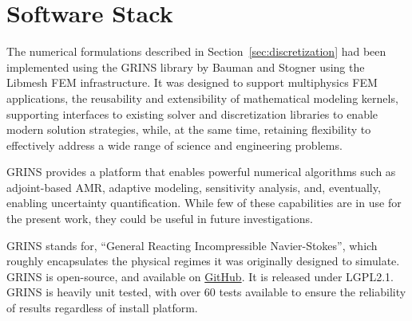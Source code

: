 

\section{Software Stack}

The numerical formulations described in Section~\ref{sec:discretization}
had been implemented using the GRINS library\cite{GRINSpaper} by Bauman
and Stogner using the Libmesh\cite{libMeshPaper} FEM infrastructure. It
was designed to support multiphysics FEM applications, the reusability
and extensibility of mathematical modeling kernels, supporting
interfaces to existing solver and discretization libraries to enable
modern solution strategies, while, at the same time, retaining
flexibility to effectively address a wide range of science and
engineering problems.   

GRINS provides a platform that enables powerful numerical algorithms
such as adjoint-based AMR, adaptive modeling, sensitivity analysis,
and, eventually, enabling uncertainty quantification. While few of these
capabilities are in use for the present work, they could be useful in
future investigations. 

GRINS stands for, ``General Reacting Incompressible Navier-Stokes'',
which roughly encapsulates the physical regimes it was originally
designed to simulate. GRINS is open-source, and available on
\hyperref[www.github.com/grinsfem/grins]{GitHub}. It is released 
under LGPL2.1.  GRINS is heavily unit tested, with over 60 tests
available to ensure the reliability of results regardless of install
platform. 

